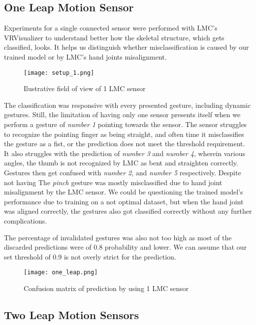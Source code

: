\subsection{One Leap Motion Sensor}

Experiments for a single connected sensor were performed with LMC's VRVisualizer to understand better how the skeletal structure, which gets classified, looks. It helps us distinguish whether misclassification is caused by our trained model or by LMC's hand joints misalignment.

\begin{figure}[ht]
    \centering
    \texttt{[image: setup\_1.png]}
    \caption{Ilustrative field of view of 1 LMC sensor}
    \label{fig:setup_1}
\end{figure}


The classification was responsive with every presented gesture, including dynamic gestures. Still, the limitation of having only one sensor presents itself when we perform a gesture of \textit{number 1} pointing towards the sensor. The sensor struggles to recognize the pointing finger as being straight, and often time it misclassifies the gesture as a fist, or the prediction does not meet the threshold requirement. It also struggles with the prediction of \textit{number 3} and \textit{number 4}, wherein various angles, the thumb is not recognized by LMC as bent and straighten correctly. Gestures then get confused with \textit{number 2}, and \textit{number 5} respectively. Despite not having  The \textit{pinch} gesture was mostly misclassified due to hand joint misalignment by the LMC sensor. We could be questioning the trained model's performance due to training on a not optimal dataset, but when the hand joint was aligned correctly, the gestures also got classified correctly without any further complications.

The percentage of invalidated gestures was also not too high as most of the discarded predictions were of 0.8 probability and lower. We can assume that our set threshold of 0.9 is not overly strict for the prediction.

\begin{figure}[ht]
    \centering
    \texttt{[image: one\_leap.png]}
    \caption{Confusion matrix of prediction by using 1 LMC sensor}
    \label{fig:confuse_1}
\end{figure}


\subsection{Two Leap Motion Sensors}

